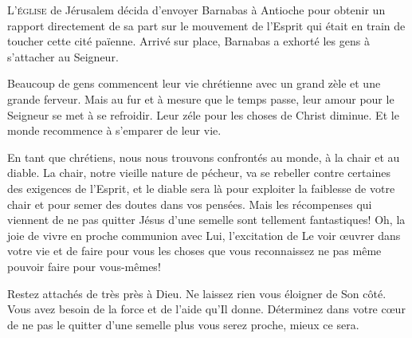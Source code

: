 



\lettrine{L}{'église} de Jérusalem décida d'envoyer Barnabas
 à Antioche pour obtenir un rapport directement de sa part sur le mouvement
 de l'Esprit qui était en train de toucher cette cité païenne.
 Arrivé sur place, Barnabas a exhorté les gens à s'attacher au Seigneur.

Beaucoup de gens commencent leur vie chrétienne avec un grand zèle
 et une grande ferveur. Mais au fur et à mesure que le temps passe,
 leur amour pour le Seigneur se met à se refroidir.
 Leur zéle pour les choses de Christ diminue.
 Et le monde recommence à s'emparer de leur vie.


En tant que chrétiens, nous nous trouvons confrontés au monde,
 à la chair et au diable. La chair, notre vieille nature de pécheur,
 va se rebeller contre certaines
 des exigences de l'Esprit, et le diable sera là pour exploiter
 la faiblesse de votre chair et pour semer des doutes dans vos pensées.
 Mais les récompenses qui viennent de ne pas quitter Jésus d'une semelle
 sont tellement fantastiques! Oh, la joie de vivre en proche communion avec Lui,
 l'excitation de Le voir \oe{}uvrer dans votre vie et de faire
 pour vous les choses que vous reconnaissez ne pas même pouvoir
 faire pour vous-mêmes!

Restez attachés de très près à Dieu. Ne laissez rien vous éloigner de Son côté.
 Vous avez besoin de la force et de l'aide qu'Il donne.
 Déterminez dans votre c\oe{}ur de ne pas le quitter d'une semelle
 \ocadr plus vous serez proche, mieux ce sera.

\dvrule






